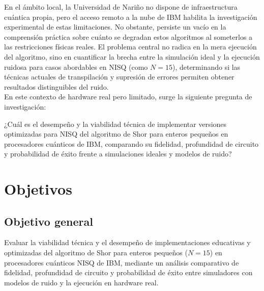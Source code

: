 \documentclass[12pt, spanish]{book}
\begin{document}
En el ámbito local, la Universidad de Nariño no dispone de infraestructura
cuántica propia, pero el acceso remoto a la nube de IBM \cite{IBM20252}
habilita la investigación experimental de estas limitaciones. No obstante, persiste
un vacío en la comprensión práctica sobre cuánto se degradan estos
algoritmos al someterlos a las restricciones físicas reales. El problema
central no radica en la mera ejecución del algoritmo, sino en cuantificar la
brecha entre la simulación ideal y la ejecución ruidosa para casos abordables
en NISQ (como $N=15$), determinando si las técnicas actuales de transpilación
y supresión de errores permiten obtener resultados distinguibles del ruido.\\

En este contexto de hardware real pero limitado, surge la siguiente pregunta
de investigación:

¿Cuál es el desempeño y la viabilidad técnica de implementar versiones
optimizadas para NISQ del algoritmo de Shor para enteros pequeños en
procesadores cuánticos de IBM, comparando su fidelidad, profundidad de
circuito y probabilidad de éxito frente a simulaciones ideales y modelos
de ruido?

\chapter{Objetivos}

\section{Objetivo general}
Evaluar la viabilidad técnica y el desempeño de implementaciones educativas y
optimizadas del algoritmo de Shor para enteros pequeños ($N=15$) en procesadores
cuánticos NISQ de IBM, mediante un análisis comparativo de fidelidad, profundidad
de circuito y probabilidad de éxito entre simuladores con modelos de ruido y
la ejecución en hardware real.
\end{document}
